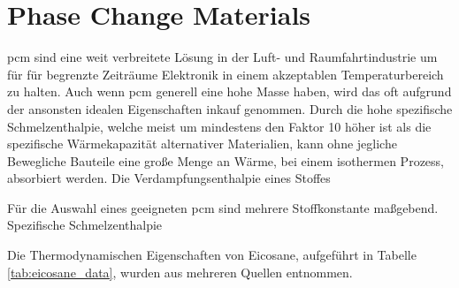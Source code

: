 \newpage

\section{Phase Change Materials}\label{sec:pcm}

\ac{pcm} sind eine weit verbreitete Lösung in der Luft- und Raumfahrtindustrie um für für begrenzte Zeiträume Elektronik in einem akzeptablen
Temperaturbereich zu halten. Auch wenn \ac{pcm} generell eine hohe Masse haben, wird das oft aufgrund der ansonsten idealen Eigenschaften inkauf genommen.
Durch die hohe spezifische Schmelzenthalpie, welche meist um mindestens den Faktor 10 höher ist als die spezifische Wärmekapazität alternativer Materialien,
kann ohne jegliche Bewegliche Bauteile eine große Menge an Wärme, bei einem isothermen Prozess, absorbiert werden. Die Verdampfungsenthalpie eines Stoffes

Für die Auswahl eines geeigneten \ac{pcm} sind mehrere Stoffkonstante maßgebend. Spezifische Schmelzenthalpie

Die Thermodynamischen Eigenschaften von Eicosane, aufgeführt in Tabelle \ref{tab:eicosane_data}, wurden aus mehreren Quellen entnommen.\\

